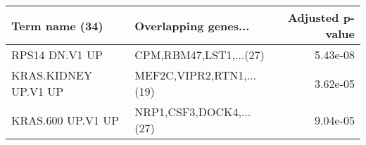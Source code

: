 \begin{tabular}{llr}
\toprule
      Term name (34) &     Overlapping genes... &  Adjusted p-value \\
\midrule
      RPS14 DN.V1 UP &   CPM,RBM47,LST1,...(27) &          5.43e-08 \\
KRAS.KIDNEY UP.V1 UP & MEF2C,VIPR2,RTN1,...(19) &          3.62e-05 \\
   KRAS.600 UP.V1 UP &  NRP1,CSF3,DOCK4,...(27) &          9.04e-05 \\
\bottomrule
\end{tabular}
